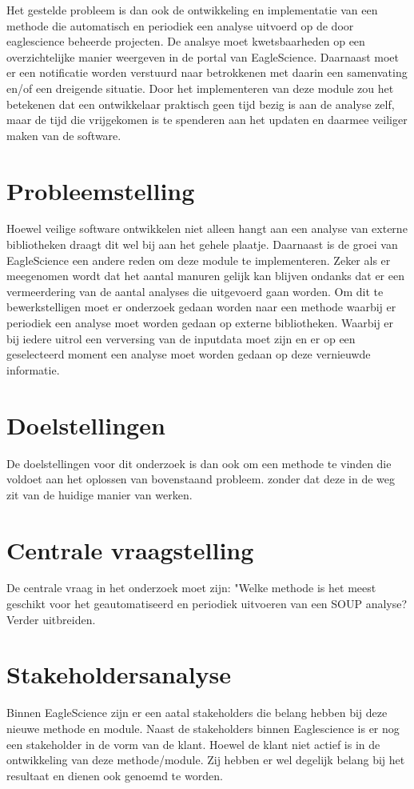 Het gestelde probleem is dan ook de ontwikkeling en implementatie van een methode die automatisch en periodiek een analyse uitvoerd op de door eaglescience beheerde projecten. De analsye moet kwetsbaarheden op een overzichtelijke manier weergeven in de portal van EagleScience. Daarnaast moet er een notificatie worden verstuurd naar betrokkenen met daarin een samenvating en/of een dreigende situatie.
Door het implementeren van deze module zou het betekenen dat een ontwikkelaar praktisch geen tijd bezig is aan de analyse zelf, maar de tijd die vrijgekomen is te spenderen aan het updaten en daarmee veiliger maken van de software.


\section{Probleemstelling}\label{sec:probleemstelling}
Hoewel veilige software ontwikkelen niet alleen hangt aan een analyse van externe bibliotheken draagt dit wel bij aan het gehele plaatje. Daarnaast is de groei van EagleScience een andere reden om deze module te implementeren. Zeker als er meegenomen wordt dat het aantal manuren gelijk kan blijven ondanks dat er een vermeerdering van de aantal analyses die uitgevoerd gaan worden. Om dit te bewerkstelligen moet er onderzoek gedaan worden naar een methode waarbij er periodiek een analyse moet worden gedaan op externe bibliotheken. Waarbij er bij iedere uitrol een verversing van de inputdata moet zijn en er op een geselecteerd moment een analyse moet worden gedaan op deze vernieuwde informatie.


\section{Doelstellingen}\label{sec:doelstellingen}
De doelstellingen voor dit onderzoek is dan ook om een methode te vinden die voldoet aan het oplossen van bovenstaand probleem. zonder dat deze in de weg zit van de huidige manier van werken.


\section{Centrale vraagstelling}\label{sec:centrale-vraagstelling}

De centrale vraag in het onderzoek moet zijn: "Welke methode is het meest geschikt voor het geautomatiseerd en periodiek uitvoeren van een SOUP analyse?
Verder uitbreiden.
\section{Stakeholdersanalyse}\label{sec:stakeholdersanalyse}
Binnen EagleScience zijn er een aatal stakeholders die belang hebben bij deze nieuwe methode en module. Naast de stakeholders binnen Eaglescience is er nog een stakeholder in de vorm van de klant. Hoewel de klant niet actief is in de ontwikkeling van deze methode/module. Zij hebben er wel degelijk belang bij het resultaat en dienen ook genoemd te worden.

